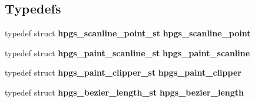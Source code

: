 \subsection*{Typedefs}
\begin{CompactItemize}
\item 
typedef struct {\bf hpgs\_\-scanline\_\-point\_\-st} \textbf{hpgs\_\-scanline\_\-point}\label{hpgspaint_8h_e61f31089d3c7a3bc1ad9cf674dff46b}

\item 
typedef struct {\bf hpgs\_\-paint\_\-scanline\_\-st} \textbf{hpgs\_\-paint\_\-scanline}\label{hpgspaint_8h_8972dfb21805e2bc16c8e26e5af30d85}

\item 
typedef struct {\bf hpgs\_\-paint\_\-clipper\_\-st} \textbf{hpgs\_\-paint\_\-clipper}\label{hpgspaint_8h_1d21a9e2b67c4475ae1a5180fe718fdc}

\item 
typedef struct {\bf hpgs\_\-bezier\_\-length\_\-st} \textbf{hpgs\_\-bezier\_\-length}\label{group__path_g5e084a0203b2fc7fcbe94b5c2a7af9b0}

\end{CompactItemize}
